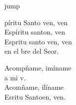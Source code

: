 \begin{cancion}jump\\
	\begin{chorus}%
		píritu Santo ven, ven\\
		Espíritu santon, ven\\
		Espritu santo ven, ven\\
		en el bre del Seor.\jump\\
	\end{chorus}%
	Acompñame, imíname\\
	a mi v.\\
	Acomñame, ilíname \\
	Esritu Santoen, ven.\\
\end{cancion}%
